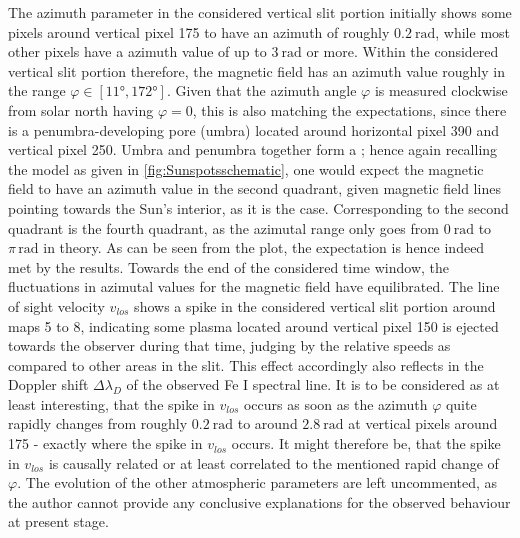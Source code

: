 \documentclass[a4paper,12pt]{report}
\def\lk#1{{\color{black}{#1}}}
\begin{document}
The azimuth parameter in the considered vertical slit portion initially shows some pixels around vertical pixel 175 to have an azimuth of roughly $\SI{0.2}{\radian}$, while most other pixels have a azimuth value of up to $\SI{3}{\radian}$ or more. Within the considered vertical slit portion therefore, the magnetic field has an azimuth value roughly in the range $\varphi \in [\ang{11}, \ang{172}]$. Given that the azimuth angle $\varphi$ is measured clockwise from solar north having $\varphi=0$, this is also matching the expectations, since there is a penumbra-developing pore (umbra) located around horizontal pixel 390 and vertical pixel 250. Umbra and penumbra together form a \lk{sunspot}; hence again recalling the \lk{sunspot} model as given in \cref{fig:Sunspotsschematic}, one would expect the magnetic field to have an azimuth value in the second quadrant, given magnetic field lines pointing towards the Sun's interior, as it is the case. Corresponding to the second quadrant is the fourth quadrant, as the azimutal range only goes from $\SI{0}{\radian}$ to $\pi\,\si{\radian}$ in theory. As can be seen from the plot, the expectation is hence indeed met by the results. Towards the end of the considered time window, the fluctuations in azimutal values for the magnetic field have equilibrated. The line of sight velocity $v_{los}$ shows a spike in the considered vertical slit portion around maps 5 to 8, indicating some plasma located around vertical pixel 150 is ejected towards the observer during that time, judging by the relative speeds as compared to other areas in the slit. This effect accordingly also reflects in the Doppler shift $\Delta \lambda_D$ of the observed Fe I spectral line. It is to be considered as at least interesting, that the spike in $v_{los}$ occurs as soon as the azimuth $\varphi$ quite rapidly changes from roughly $\SI{0.2}{\radian}$ to around $\SI{2.8}{\radian}$ at vertical pixels around 175 - exactly where the spike in $v_{los}$ occurs. It might therefore be, that the spike in $v_{los}$ is causally related or at least correlated to the mentioned rapid change of $\varphi$. The evolution of the other atmospheric parameters are left uncommented, as the author cannot provide any conclusive explanations for the observed behaviour at present stage.
\end{document}
